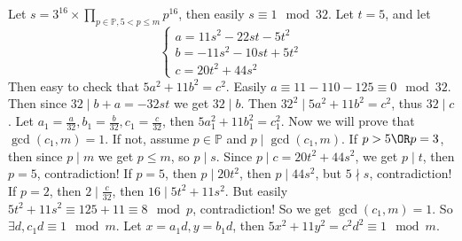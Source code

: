 \documentclass{ctexart}
\begin{document}
\begin{solution}
  Let \(s=3^{16} \times \prod_{p \in \mathbb{P},5<p \leq m}p^{16}\), then easily \(s \equiv 1 \mod 32\).
  Let \(t=5\), and let
  \[
    \begin{cases}
      a=11s^2-22st-5t^2  \\
      b=-11s^2-10st+5t^2 \\
      c=20t^2+44s^2
    \end{cases}
  \]
  Then easy to check that \(5a^2+11b^2=c^2\).
  Easily \(a \equiv 11-110-125 \equiv 0\mod 32\).
  Then since \(32 \mid b+a = -32st\) we get \(32 \mid b\).
  Then \(32^2 \mid 5a^2+11b^2 = c^2\), thus \(32 \mid c\).
  Let \(a_1=\frac{a}{32},b_1=\frac{b}{32},c_1=\frac{c}{32}\), then \(5 a_1^2+11 b_1^2=c_1^2\).
  Now we will prove that \(\gcd(c_1,m)=1\). If not, assume \(p \in \mathbb{P}\) and \(p \mid \gcd(c_1,m)\).
  If \(p>5 \OR p=3\), then since \(p \mid m\) we get \(p \leq m\), so \(p \mid s\).
  Since \(p \mid c=20t^2+44s^2\), we get \(p \mid t\), then \(p=5\), contradiction!
  If \(p=5\), then \(p \mid 20 t^2\), then \(p \mid 44 s^2\), but \(5 \nmid s\), contradiction!
  If \(p=2\), then \(2 \mid \frac{c}{32}\), then \(16 \mid 5t^2+11s^2\).
  But easily \(5 t^2 + 11 s^2 \equiv 125+11 \equiv 8 \mod p\), contradiction!
  So we get \(\gcd(c_1,m)=1\).
  So \(\exists d,c_1 d \equiv 1 \mod m\).
  Let \(x=a_1 d,y=b_1 d\), then \(5x^2+11y^2 =c^2d^2 \equiv 1 \mod m\).
\end{solution}
\end{document}
